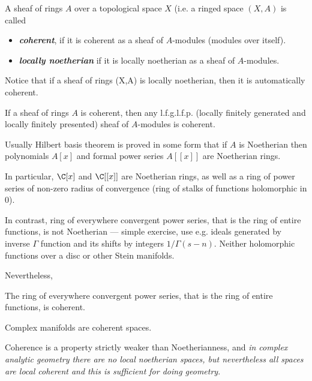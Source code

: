 \begin{defn}
	A sheaf of rings $A$ over a topological space $X$ (i.e.  a ringed space $(X,A)$ is called
	
	\begin{itemize}
		\item  \textbf{\textit{coherent}}, if it is coherent as a sheaf of $A$-modules (modules over itself).
		
		\item  \textbf{\textit{locally noetherian}} if it is locally noetherian as a sheaf of $A$-modules.
	\end{itemize}
\end{defn}
Notice that if a sheaf of rings (X,A) is locally noetherian, then  it is automatically coherent.
\begin{prop}
	If a sheaf of rings $A$ is coherent, then any l.f.g.l.f.p. (locally finitely generated and locally finitely presented) sheaf of $A$-modules is coherent.
\end{prop}
\begin{remark}
	Usually Hilbert basis theorem is proved in some form that if $A$ is Noetherian then polynomials $A[x]$ and formal power series $A[[x]]$ are Noetherian rings.
	
	In particular, $\C[x]$ and $\C[[x]]$ are Noetherian rings, as well as a ring of power series of non-zero radius of convergence (ring of stalks of functions holomorphic in 0).
\end{remark}
\begin{exercise}
	In contrast, ring of everywhere convergent power series, that is the ring of entire functions, is not Noetherian — simple exercise, use e.g. ideals generated by inverse $\Gamma$ function and its shifts by integers $1/\Gamma(s-n)$. Neither holomorphic functions over a disc or other Stein manifolds.
\end{exercise}
Nevertheless, 
\begin{thm}
	The ring of everywhere convergent power series, that is the ring of entire functions, is coherent.
\end{thm}
\begin{coro}
	Complex manifolds are coherent spaces.
\end{coro}
Coherence is a property strictly weaker than Noetherianness, and \textit{in complex analytic geometry there are no local noetherian spaces, but nevertheless all spaces are local coherent and this is sufficient for doing geometry}.

